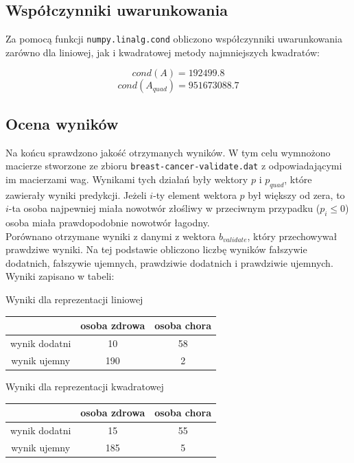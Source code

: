 \documentclass{article}
\begin{document}
	\subsection*{Współczynniki uwarunkowania}
	
	Za pomocą funkcji \texttt{numpy.linalg.cond} obliczono współczynniki uwarunkowania zarówno dla liniowej, jak i kwadratowej metody najmniejszych kwadratów:
	
	$$cond(A) = 192499.8$$
	$$cond(A_{quad}) = 951673088.7$$
	
	\subsection*{Ocena wyników}
	
	Na końcu sprawdzono jakość otrzymanych wyników. W tym celu wymnożono macierze stworzone ze zbioru \texttt{breast-cancer-validate.dat} z odpowiadającymi im macierzami wag. Wynikami tych działań były wektory $p$ i $p_{quad}$, które zawierały wyniki predykcji. Jeżeli $i$-ty element wektora $p$ był większy od zera, to $i$-ta osoba najpewniej miała nowotwór złośliwy w przeciwnym przypadku ($p_i \leq 0$) osoba miała prawdopodobnie nowotwór łagodny. \\
	Porównano otrzymane wyniki z danymi z wektora $b_{validate}$, który przechowywał prawdziwe wyniki. Na tej podstawie obliczono liczbę wyników fałszywie dodatnich, fałszywie ujemnych, prawdziwie dodatnich i prawdziwie ujemnych. Wyniki zapisano w tabeli:
	
	\begin{center}
		\caption{Wyniki dla reprezentacji liniowej}
		\begin{tabular}{|c|c|c|}
  			\hline 
  			 & osoba zdrowa & osoba chora\\
  			\hline
  			wynik dodatni & 10 & 58 \\
  			\hline
  			wynik ujemny & 190 & 2 \\
  			\hline
		\end{tabular} 
		
	\end{center}
		
		
	
	\begin{center}
		\caption{Wyniki dla reprezentacji kwadratowej}
		\begin{tabular}{|c|c|c|}
  			\hline 
  			 & osoba zdrowa & osoba chora\\
  			\hline
  			wynik dodatni & 15 & 55 \\
  			\hline
  			wynik ujemny & 185 & 5 \\
  			\hline
		\end{tabular} 
		
	\end{center}
	
\end{document}
